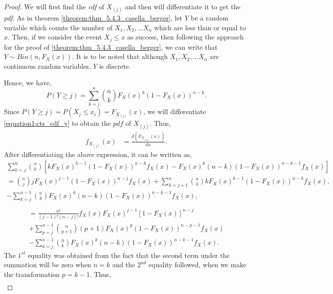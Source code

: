 \documentclass[a4paper,english,12pt]{article}
\begin{document}
\begin{proof}
We will first find the {\it cdf} of $X_{(j)}$ and then will differentiate it to get the {\it pdf}. As in theorem \ref{theorem:thm_5.4.3_casella_berger}, let $Y$ be a random variable which counts the number of $X_1,X_2, \dots X_n$ which are less than or equal to $x$. Then, if we consider the event ${X_j \leq x}$ as success, then following the approach for the proof of \ref{theorem:thm_5.4.3_casella_berger}, we can write that $Y \sim Bin(n,F_X (x))$. It is to be noted that although $X_1,X_2, \dots X_n$ are continuous random variables, $Y$ is discrete.
\par Hence, we have,
\begin{equation} \label{equation1:cts_cdf_y}
P(Y \geq j)= {\sum\limits_{k=j}^n} \binom{n}{k} F_X (x) ^{k} (1-F_X (x))^{n-k}.
\end{equation}
Since $P(Y \geq j)=P(X_j \leq x_i)=F_{X_(j)} (x)$, we will differentiate \eqref{equation1:cts_cdf_y} to obtain the $pdf$ of $X_{(j)}$. Thus,
\begin{align}
f_{X_{(j)}} (x)&=\frac{d(F_{X_{(j)}} (x))}{dx}. \nonumber
\end{align}
After differentiating the above expression, it can be written as,
\begin{multline}
{\sum\limits_{k=j}^n} \binom{n}{k} [ k F_X (x) ^{k-1} (1-F_X (x))^{n-k}f_X (x) - F_X (x) ^{k} (n-k) (1-F_X (x))^{n-k-1} f_X (x)] \nonumber \\
=\binom{n}{j}j F_X (x) ^{j-1} (1-F_X (x))^{n-j}f_X (x)+{\sum\limits_{k=j+1}^n} \binom{n}{k} k F_X (x) ^{k-1} (1-F_X (x))^{n-k}f_X (x),\nonumber \\ 
-{\sum\limits_{k=j}^{n-1}} \binom{n}{k} F_X (x) ^{k} (n-k) (1-F_X (x))^{n-k-1} f_X (x),\nonumber \\
\end{multline}
\begin{multline} 
=\frac{n!}{(j-1)!(n-j)!} f_X (x) F_X (x) ^{j-1} [1 - F_X (x)]^{n-j}\nonumber \\+ {\sum\limits_{p=j}^{n-1}} \binom{n}{p+1} (p+1) F_X (x) ^{p} (1-F_X (x))^{n-p-1}f_X (x)\nonumber \\
-{\sum\limits_{k=j}^{n-1}} \binom{n}{k} F_X (x) ^{k} (n-k) (1-F_X (x))^{n-k-1} f_X (x).
\end{multline}
The $1^{st}$ equality was obtained from the fact that the second term under the summation will be zero when $n=k$ and the $2^{nd}$ equality followed, when we make the transformation $p=k-1$.
Thus,
\begin{align}
\label{eqn:final_simplified_form_before_using_combination}

\end{align}
\end{proof}
\end{document}
